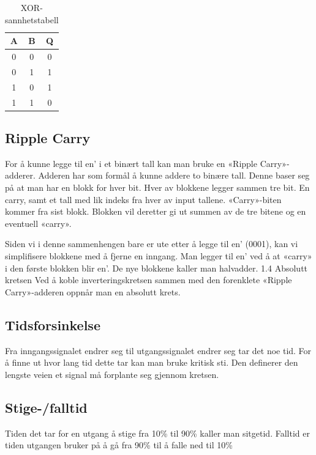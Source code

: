 \documentclass{article}
\begin{document}
\begin{table}[h]
	\centering
	\caption{XOR-sannhetstabell}
	\label{truth-label}
	
	\vspace{0.2cm}
	\begin{tabular}{| c | c | c |} \hline
		A & B & Q \\ \hline
		0 & 0 & 0 \\ \hline
		0 & 1 & 1 \\ \hline
		1 & 0 & 1 \\ \hline
		1 & 1 & 0 \\ \hline
	\end{tabular}
\end{table}

\subsection{Ripple Carry}
For å kunne legge til en’ i et binært tall kan man bruke en «Ripple Carry»-adderer. Adderen har som formål å kunne addere to binære tall. Denne baser seg på at man har en blokk for hver bit. Hver av blokkene legger sammen tre bit. En carry, samt et tall med lik indeks fra hver av input tallene. «Carry»-biten kommer fra sist blokk. Blokken vil deretter gi ut summen av de tre bitene og en eventuell «carry».

Siden vi i denne sammenhengen bare er ute etter å legge til en’ (0001), kan vi simplifisere blokkene med å fjerne en inngang. Man legger til en’ ved å at «carry» i den første blokken blir en’. De nye blokkene kaller man halvadder.
1.4 Absolutt kretsen
Ved å koble inverteringskretsen sammen med den forenklete «Ripple Carry»-adderen oppnår man en absolutt krets.

\subsection{Tidsforsinkelse}
Fra inngangssignalet endrer seg til utgangssignalet endrer seg tar det noe tid. For å finne ut hvor lang tid dette tar kan man bruke kritisk sti. Den definerer den lengste veien et signal må forplante seg gjennom kretsen.

\subsection{Stige-/falltid}
Tiden det tar for en utgang å stige fra 10\% til 90\% kaller man sitgetid. Falltid er tiden utgangen bruker på å gå fra 90\% til å falle ned til 10\%
\end{document}
